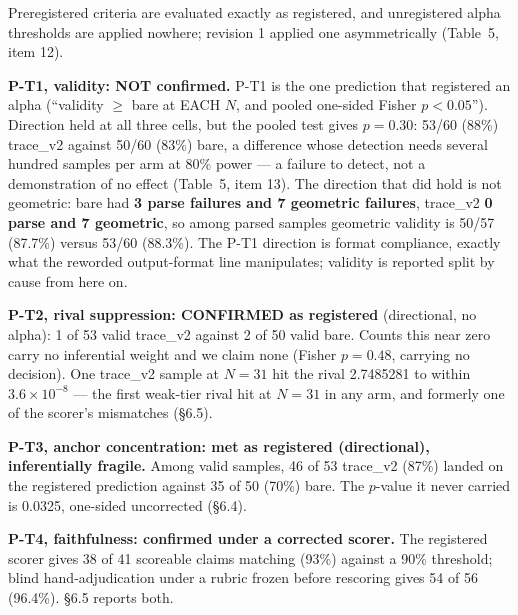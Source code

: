 \documentclass[11pt]{article}
\begin{document}
Preregistered criteria are evaluated exactly as registered, and unregistered alpha thresholds are
applied nowhere; revision 1 applied one asymmetrically (Table~5, item 12).

\textbf{P-T1, validity: NOT confirmed.} P-T1 is the one prediction that registered an alpha (``validity
$\ge$ bare at EACH $N$, and pooled one-sided Fisher $p < 0.05$''). Direction held at all three cells, but
the pooled test gives $p = 0.30$: 53/60 (88\%) trace\_v2 against 50/60 (83\%) bare, a difference whose
detection needs several hundred samples per arm at 80\% power --- a failure to detect, not a
demonstration of no effect (Table~5, item 13). The direction that did hold is not geometric: bare
had \textbf{3 parse failures and 7 geometric failures}, trace\_v2 \textbf{0 parse and 7 geometric}, so among
parsed samples geometric validity is 50/57 (87.7\%) versus 53/60 (88.3\%). The P-T1 direction is
format compliance, exactly what the reworded output-format line manipulates; validity is reported
split by cause from here on.

\textbf{P-T2, rival suppression: CONFIRMED as registered} (directional, no alpha): 1 of 53 valid
trace\_v2 against 2 of 50 valid bare. Counts this near zero carry no inferential weight and we
claim none (Fisher $p = 0.48$, carrying no decision). One trace\_v2 sample at $N = 31$ hit the rival
2.7485281 to within $3.6\times10^{-8}$ --- the first weak-tier rival hit at $N = 31$ in any arm, and formerly
one of the scorer's mismatches (\S6.5).

\textbf{P-T3, anchor concentration: met as registered (directional), inferentially fragile.} Among
valid samples, 46 of 53 trace\_v2 (87\%) landed on the registered prediction against 35 of 50 (70\%)
bare. The $p$-value it never carried is 0.0325, one-sided uncorrected (\S6.4).

\textbf{P-T4, faithfulness: confirmed under a corrected scorer.} The registered scorer gives 38 of 41
scoreable claims matching (93\%) against a 90\% threshold; blind hand-adjudication under a rubric
frozen before rescoring gives 54 of 56 (96.4\%). \S6.5 reports both.
\end{document}
